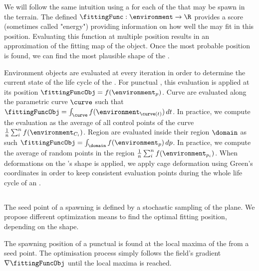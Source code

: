 We will follow the same intuition using a  for each of the  that may be spawn in the terrain. The  defined $\fittingFunc: \environment \to \R$ provides a score (sometimes called "energy") providing information on how well the  may fit in this position. Evaluating this function at multiple position results in an approximation of the fitting map of the object. Once the most probable position is found, we can find the most plausible shape of the .

Environment objects are evaluated at every iteration in order to determine the current state of the life cycle of the . For punctual , this evaluation is applied at its position $\fittingFuncObj = f(\environment_{p})$. Curve  are evaluated along the parametric curve $\curve$ such that $\fittingFuncObj = \int_{\curve} f(\environment_{\curve(t)}) \,dt$. In practice, we compute the evaluation as the average of all control points of the curve $\frac{1}{n} \sum_{i}^{n}{f(\environment_{C_i})}$.
Region  are evaluated inside their region $\domain$ as such $\fittingFuncObj = \int_{\domain} f(\environment_p) \,dp$. In practice, we compute the average of random points in the region $\frac{1}{n} \sum_{i}^{n}{f(\environment_{p_i})}$. When deformations on the 's shape is applied, we apply cage deformation using Green's coordinates in order to keep consistent evaluation points during the whole life cycle of an .

\subsection{}
The seed point of a spawning  is defined by a stochastic sampling of the plane. We propose different optimization means to find the optimal fitting position, depending on the  shape.

The spawning position of a punctual  is found at the local maxima of the  from a seed point. The optimisation process simply follows the field's gradient $\nabla \fittingFuncObj$ until the local maxima is reached.

